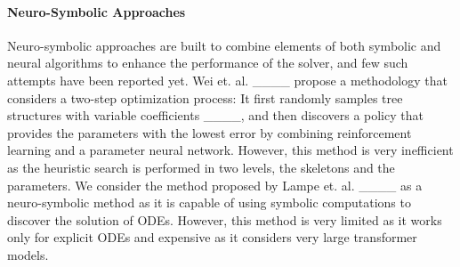 \paragraph{Neuro-Symbolic Approaches} Neuro-symbolic approaches are built to combine elements of both symbolic and neural algorithms to enhance the performance of the solver, and few such attempts have been reported yet. Wei et. al. ____ propose a methodology that considers a two-step optimization process: It first randomly samples tree structures with variable coefficients ____, and then discovers a policy that provides the parameters with the lowest error by combining reinforcement learning and a parameter neural network. However, this method is very inefficient as the heuristic search is performed in two levels, the skeletons and the parameters. We consider the method proposed by Lampe et. al. ____ as a neuro-symbolic method as it is capable of using symbolic computations to discover the solution of ODEs. However, this method is very limited as it works only for explicit ODEs and expensive as it considers very large transformer models.